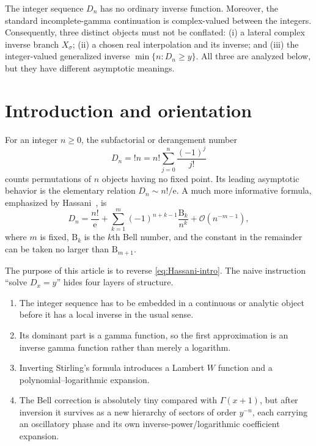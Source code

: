 \documentclass[11pt,a4paper]{article}
\numberwithin{equation}{section}
\theoremstyle{definition}
\theoremstyle{remark}
\newcommand{\e}{\mathrm e}
\newcommand{\Ord}{\mathcal O}
\newcommand{\Bell}{\mathrm B}
\begin{document}
\begin{warningbox}
The integer sequence $D_n$ has no ordinary inverse function.  Moreover, the
standard incomplete-gamma continuation is complex-valued between the
integers.  Consequently, three distinct objects must not be conflated:
(i) a lateral complex inverse branch $X_{\sigma}$; (ii) a chosen real
interpolation and its inverse; and (iii) the integer-valued generalized
inverse $\min\{n:D_n\ge y\}$.  All three are analyzed below, but they have
different asymptotic meanings.
\end{warningbox}

\tableofcontents
\newpage

\section{Introduction and orientation}

For an integer $n\ge0$, the subfactorial or derangement number
\begin{equation}\label{eq:Dn-def}
 D_n={!n}=n!\sum_{j=0}^{n}\frac{(-1)^j}{j!}
\end{equation}
counts permutations of $n$ objects having no fixed point.  Its leading
asymptotic behavior is the elementary relation $D_n\sim n!/\e$.  A much more
informative formula, emphasized by Hassani~\cite{Hassani2020}, is
\begin{equation}\label{eq:Hassani-intro}
 D_n=\frac{n!}{\e}
 +\sum_{k=1}^{m}(-1)^{n+k-1}\frac{\Bell_k}{n^k}
 +\Ord(n^{-m-1}),
\end{equation}
where $m$ is fixed, $\Bell_k$ is the $k$th Bell number, and the constant in
the remainder can be taken no larger than $\Bell_{m+1}$.

The purpose of this article is to reverse \eqref{eq:Hassani-intro}.  The
naive instruction ``solve $D_x=y$'' hides four layers of structure.

\begin{enumerate}
\item The integer sequence has to be embedded in a continuous or analytic
      object before it has a local inverse in the usual sense.
\item Its dominant part is a gamma function, so the first approximation is
      an inverse gamma function rather than merely a logarithm.
\item Inverting Stirling's formula introduces a Lambert $W$ function and a
      polynomial--logarithmic expansion.
\item The Bell correction is absolutely tiny compared with $\Gamma(x+1)$,
      but after inversion it survives as a new hierarchy of sectors of
      order $y^{-n}$, each carrying an oscillatory phase and its own
      inverse-power/logarithmic coefficient expansion.
\end{enumerate}
\end{document}
